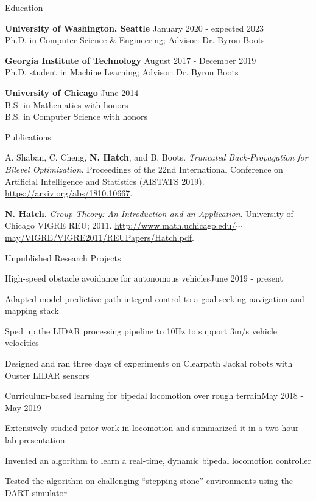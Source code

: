 \documentclass{resume} %
\begin{document}
\begin{rSection}{Education}

{\bf University of Washington, Seattle} \hfill {January 2020 - expected 2023} \\
Ph.D. in Computer Science \& Engineering; Advisor: Dr. Byron Boots

{\bf Georgia Institute of Technology} \hfill {August 2017 - December 2019} \\
Ph.D. student in Machine Learning; Advisor: Dr. Byron Boots

{\bf University of Chicago} \hfill {June 2014} \\
B.S. in Mathematics with honors \\
B.S. in Computer Science with honors

\end{rSection}

\begin{rSection}{Publications}

A. Shaban, C. Cheng, {\bf N. Hatch}, and B. Boots. {\em Truncated Back-Propagation for Bilevel Optimization.}
Proceedings of the 22nd International Conference on Artificial Intelligence and Statistics (AISTATS 2019).
\href{https://arxiv.org/abs/1810.10667}{https://arxiv.org/abs/1810.10667}.

{\bf N. Hatch}. {\em Group Theory: An Introduction and an Application}. University of Chicago VIGRE REU; 2011.
\href{http://www.math.uchicago.edu/~may/VIGRE/VIGRE2011/REUPapers/Hatch.pdf}{http://www.math.uchicago.edu/$\sim$may/VIGRE/VIGRE2011/REUPapers/Hatch.pdf}.

\end{rSection}

\begin{rSection}{Unpublished Research Projects}

\begin{rProject}{High-speed obstacle avoidance for autonomous vehicles}{June 2019 - present}
\item Adapted model-predictive path-integral control to a goal-seeking navigation and mapping stack
\item Sped up the LIDAR processing pipeline to 10Hz to support 3m/s vehicle velocities
\item Designed and ran three days of experiments on Clearpath Jackal robots with Ouster LIDAR sensors
\end{rProject}

\begin{rProject}{Curriculum-based learning for bipedal locomotion over rough terrain}{May 2018 - May 2019}
\item Extensively studied prior work in locomotion and summarized it in a two-hour lab presentation
\item Invented an algorithm to learn a real-time, dynamic bipedal locomotion controller
\item Tested the algorithm on challenging ``stepping stone'' environments using the DART simulator
\end{rProject}

\end{rSection}
\end{document}
